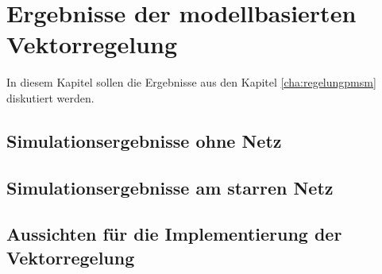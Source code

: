
\chapter{Ergebnisse der modellbasierten Vektorregelung}
\label{chap:ergebnisse-foc}

In diesem Kapitel sollen die Ergebnisse aus den Kapitel \ref{cha:regelungpmsm} diskutiert werden.

\section{Simulationsergebnisse ohne Netz}\label{sec:sim-ohne-netz}


\section{Simulationsergebnisse am starren Netz}\label{sec:sim-starr-netz}


\section{Aussichten für die Implementierung der Vektorregelung}\label{sec:aussichten-foc}





